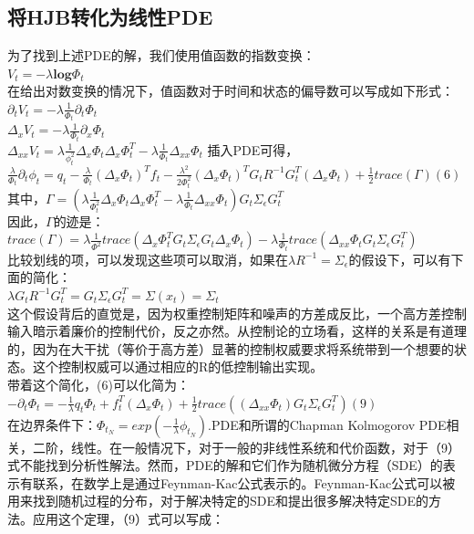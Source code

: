 \documentclass[2pt,a4paper]{article}
\begin{document}
\subsection{将HJB转化为线性PDE}
为了找到上述PDE的解，我们使用值函数的指数变换：\\
$V_t=-\lambda \mathbf{log} \Phi_t$\\
在给出对数变换的情况下，值函数对于时间和状态的偏导数可以写成如下形式：\\
$\partial_t V_t=-\lambda \frac{1}{\Phi_t}\partial_t\Phi_t$\\
$\Delta_x V_t=-\lambda \frac{1}{\Phi_t} \partial_x \Phi_t$\\
$\Delta_{xx}V_t=\lambda \frac{1}{\phi_t^2} \Delta_x \Phi_t \Delta_x \Phi_t^T-\lambda \frac{1}{\Phi_t}\Delta_{xx}\Phi_t$
插入PDE可得，\\
$\frac{\lambda}{\Phi_t}\partial_t \phi_t = q_t -\frac{\lambda}{\Phi_t}(\Delta_x \Phi_t)^Tf_t-\frac{\lambda^2}{2\Phi_t^2}(\Delta_x \Phi_t)^T G_t R^{-1}G_t^T(\Delta_x \Phi_t)+\frac{1}{2}trace(\Gamma) (6)$\\
其中，$\Gamma=(\lambda \frac{1}{\Phi_t^2}\Delta_x \Phi_t \Delta_x \Phi_t^T -\lambda \frac{1}{\Phi_t}\Delta_{xx}\Phi_t)G_t\Sigma_{\epsilon}G_t^T$\\
因此，$\Gamma$的迹是：\\
$trace(\Gamma)=\lambda \frac{1}{\Phi^2}trace (\Delta_x \Phi_t^TG_t\Sigma_{\epsilon}G_t\Delta_x \Phi_t)-\lambda \frac{1}{\Phi_t}trace(\Delta_{xx}\Phi_tG_t\Sigma_{\epsilon}G_t^T)$\\
比较划线的项，可以发现这些项可以取消，如果在$\lambda R^{-1}=\Sigma_{\epsilon}$的假设下，可以有下面的简化：\\
$\lambda G_t R^{-1}G_t^T=G_t\Sigma_{\epsilon}G_t^T=\Sigma(x_t)=\Sigma_t$\\
这个假设背后的直觉是，因为权重控制矩阵和噪声的方差成反比，一个高方差控制输入暗示着廉价的控制代价，反之亦然。从控制论的立场看，这样的关系是有道理的，因为在大干扰（等价于高方差）显著的控制权威要求将系统带到一个想要的状态。这个控制权威可以通过相应的R的低控制输出实现。\\
带着这个简化，(6)可以化简为：\\
$-\partial_t \Phi_t= -\frac{1}{\lambda}q_t\Phi_t+f_t^T(\Delta_x \Phi_t)+\frac{1}{2}trace((\Delta_{xx}\Phi_t)G_t\Sigma_{\epsilon}G_t^T)(9)$\\
在边界条件下：$\Phi_{t_N}=exp(-\frac{1}{\lambda}\phi_{t_N})$.PDE和所谓的Chapman Kolmogorov PDE相关，二阶，线性。在一般情况下，对于一般的非线性系统和代价函数，对于（9）式不能找到分析性解法。然而，PDE的解和它们作为随机微分方程（SDE）的表示有联系，在数学上是通过Feynman-Kac公式表示的。Feynman-Kac公式可以被用来找到随机过程的分布，对于解决特定的SDE和提出很多解决特定SDE的方法。应用这个定理，（9）式可以写成：\\
\end{document}
